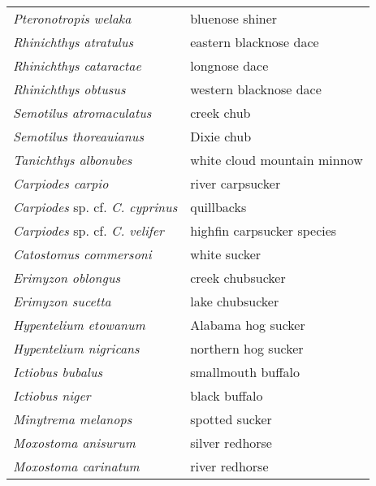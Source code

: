 \documentclass[11pt]{article}
\begin{document}
\newpage

\vspace{\baselineskip}

%
\textbf{\Student}

\begin{tabular}{@{}L{3in}L{3in}@{}}
\textit{Pteronotropis welaka} &   bluenose shiner\tabularnewline
\textit{Rhinichthys atratulus} &   eastern blacknose dace\tabularnewline
\textit{Rhinichthys cataractae} &   longnose dace\tabularnewline
\textit{Rhinichthys obtusus} &   western blacknose dace\tabularnewline
\textit{Semotilus atromaculatus} &   creek chub\tabularnewline
\textit{Semotilus thoreauianus} &   Dixie chub\tabularnewline
\textit{Tanichthys albonubes} &   white cloud mountain minnow\tabularnewline
\textit{Carpiodes carpio} &   river carpsucker\tabularnewline
\textit{Carpiodes} sp. cf. \textit{C. cyprinus} &   quillbacks\tabularnewline
\textit{Carpiodes} sp. cf. \textit{C. velifer} &   highfin carpsucker species\tabularnewline
\textit{Catostomus commersoni} &   white sucker\tabularnewline
\textit{Erimyzon oblongus} &   creek chubsucker\tabularnewline
\textit{Erimyzon sucetta} &   lake chubsucker\tabularnewline
\textit{Hypentelium etowanum} &   Alabama hog sucker\tabularnewline
\textit{Hypentelium nigricans} &   northern hog sucker\tabularnewline
\textit{Ictiobus bubalus} &   smallmouth buffalo\tabularnewline
\textit{Ictiobus niger} &   black buffalo\tabularnewline
\textit{Minytrema melanops} &   spotted sucker\tabularnewline
\textit{Moxostoma anisurum} &   silver redhorse\tabularnewline
\textit{Moxostoma carinatum} &   river redhorse\tabularnewline
\end{tabular}

\vspace{\baselineskip}

%
\textbf{\Student}
\end{document}
